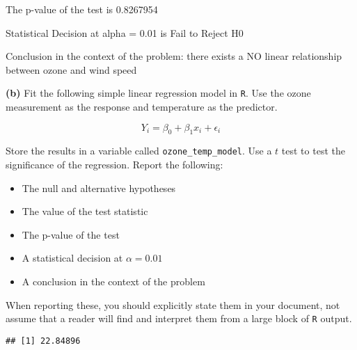 \documentclass[
]{article}
\newenvironment{Shaded}{\begin{snugshade}}{\end{snugshade}}
\newcommand{\DataTypeTok}[1]{\textcolor[rgb]{0.13,0.29,0.53}{#1}}
\newcommand{\KeywordTok}[1]{\textcolor[rgb]{0.13,0.29,0.53}{\textbf{#1}}}
\newcommand{\NormalTok}[1]{#1}
\newcommand{\OperatorTok}[1]{\textcolor[rgb]{0.81,0.36,0.00}{\textbf{#1}}}
\newcommand{\StringTok}[1]{\textcolor[rgb]{0.31,0.60,0.02}{#1}}
\providecommand{\tightlist}{%
  \setlength{\itemsep}{0pt}\setlength{\parskip}{0pt}}
\begin{document}
The p-value of the test is 0.8267954

Statistical Decision at alpha = 0.01 is Fail to Reject H0

Conclusion in the context of the problem: there exists a NO linear
relationship between ozone and wind speed

\textbf{(b)} Fit the following simple linear regression model in
\texttt{R}. Use the ozone measurement as the response and temperature as
the predictor.

\[
Y_i = \beta_0 + \beta_1 x_i + \epsilon_i
\]

Store the results in a variable called \texttt{ozone\_temp\_model}. Use
a \(t\) test to test the significance of the regression. Report the
following:

\begin{itemize}
\tightlist
\item
  The null and alternative hypotheses
\item
  The value of the test statistic
\item
  The p-value of the test
\item
  A statistical decision at \(\alpha = 0.01\)
\item
  A conclusion in the context of the problem
\end{itemize}

When reporting these, you should explicitly state them in your document,
not assume that a reader will find and interpret them from a large block
of \texttt{R} output.

\begin{Shaded}
\end{Shaded}

\begin{verbatim}
## [1] 22.84896
\end{verbatim}

\begin{Shaded}
\end{Shaded}
\end{document}
